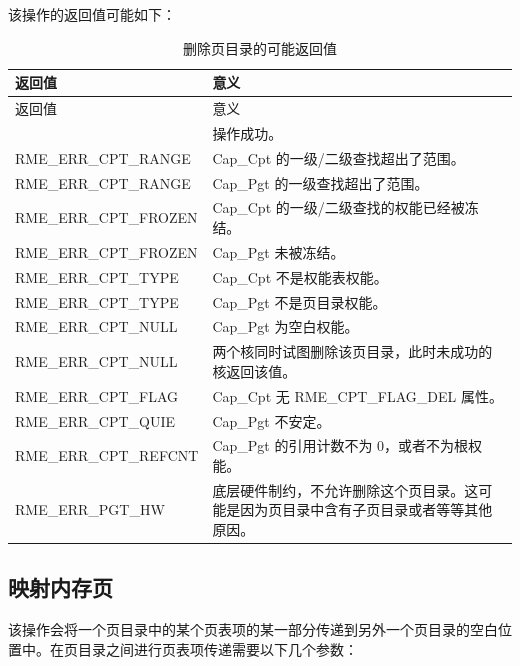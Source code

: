 该操作的返回值可能如下：

\begin{xltabular}{\textwidth}{@{}>{\hsize\raggedright\arraybackslash}X>{\hsize\raggedright\arraybackslash}X@{}}
\caption{删除页目录的可能返回值}\label{tab:3-13-delete-page-directory-return-values}\\
\toprule
返回值 & 意义\tabularnewline
\endfirsthead
\toprule
返回值 & 意义\tabularnewline
\midrule
\endhead
\bottomrule
{} & 操作成功。\tabularnewline
    RME\_ERR\_CPT\_RANGE & Cap\_Cpt 的一级/二级查找超出了范围。\tabularnewline
    RME\_ERR\_CPT\_RANGE & Cap\_Pgt 的一级查找超出了范围。\tabularnewline
    RME\_ERR\_CPT\_FROZEN & Cap\_Cpt 的一级/二级查找的权能已经被冻结。\tabularnewline
    RME\_ERR\_CPT\_FROZEN & Cap\_Pgt 未被冻结。\tabularnewline
    RME\_ERR\_CPT\_TYPE & Cap\_Cpt 不是权能表权能。\tabularnewline
    RME\_ERR\_CPT\_TYPE & Cap\_Pgt 不是页目录权能。\tabularnewline
    RME\_ERR\_CPT\_NULL & Cap\_Pgt 为空白权能。\tabularnewline
    RME\_ERR\_CPT\_NULL & 两个核同时试图删除该页目录，此时未成功的核返回该值。\tabularnewline
    RME\_ERR\_CPT\_FLAG & Cap\_Cpt 无 RME\_CPT\_FLAG\_DEL 属性。\tabularnewline
    RME\_ERR\_CPT\_QUIE & Cap\_Pgt 不安定。\tabularnewline
    RME\_ERR\_CPT\_REFCNT & Cap\_Pgt 的引用计数不为 0，或者不为根权能。\tabularnewline
    RME\_ERR\_PGT\_HW & 底层硬件制约，不允许删除这个页目录。这可能是因为页目录中含有子页目录或者等等其他原因。\tabularnewline
\end{xltabular}

\subsection{映射内存页}\label{subsec:3-map-memory-page}

该操作会将一个页目录中的某个页表项的某一部分传递到另外一个页目录的空白位置中。在页目录之间进行页表项传递需要以下几个参数：

